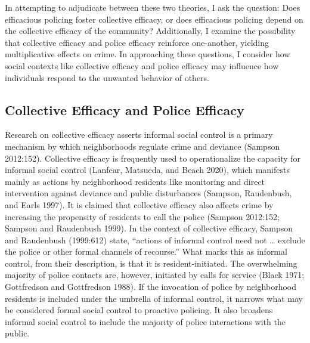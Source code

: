 \documentclass [11pt, proquest] {uwthesis}[2015/03/03]
\begin{document}
In attempting to adjudicate between these two theories, I ask the question: Does efficacious policing foster collective efficacy, or does efficacious policing depend on the collective efficacy of the community? Additionally, I examine the possibility that collective efficacy and police efficacy reinforce one-another, yielding multiplicative effects on crime. In approaching these questions, I consider how social contexts like collective efficacy and police efficacy may influence how individuals respond to the unwanted behavior of others.

\hypertarget{collective-efficacy-and-police-efficacy}{%
\subsection{Collective Efficacy and Police Efficacy}\label{collective-efficacy-and-police-efficacy}}

Research on collective efficacy asserts informal social control is a primary mechanism by which neighborhoods regulate crime and deviance (Sampson 2012:152). Collective efficacy is frequently used to operationalize the capacity for informal social control (Lanfear, Matsueda, and Beach 2020), which manifests mainly as actions by neighborhood residents like monitoring and direct intervention against deviance and public disturbances (Sampson, Raudenbush, and Earls 1997). It is claimed that collective efficacy also affects crime by increasing the propensity of residents to call the police (Sampson 2012:152; Sampson and Raudenbush 1999). In the context of collective efficacy, Sampson and Raudenbush (1999:612) state, ``actions of informal control need not \ldots{} exclude the police or other formal channels of recourse.'' What marks this as informal control, from their description, is that it is resident-initiated. The overwhelming majority of police contacts are, however, initiated by calls for service (Black 1971; Gottfredson and Gottfredson 1988). If the invocation of police by neighborhood residents is included under the umbrella of informal control, it narrows what may be considered formal social control to proactive policing. It also broadens informal social control to include the majority of police interactions with the public.
\end{document}
